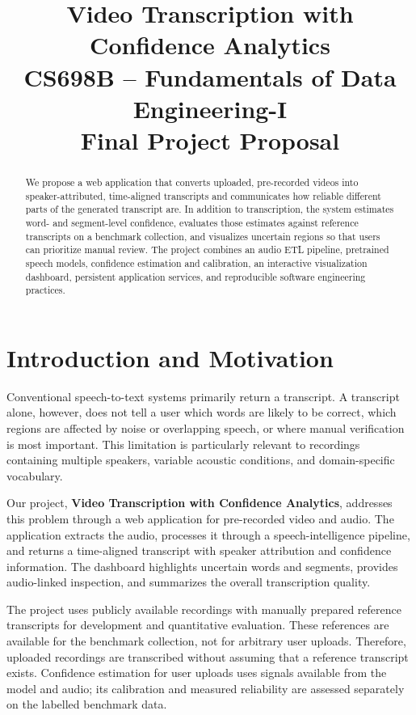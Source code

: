 \documentclass[11pt,a4paper]{article}
\title{\vspace{-1.1cm}\textbf{\Huge Video Transcription with Confidence Analytics}\\[0.35em]
\large CS698B -- Fundamentals of Data Engineering-I\\
\normalsize Final Project Proposal}
\author{}
\date{}
\begin{document}
\maketitle
\vspace{-1.2em}

\begin{abstract}
We propose a web application that converts uploaded, pre-recorded videos into
speaker-attributed, time-aligned transcripts and communicates how reliable
different parts of the generated transcript are. In addition to transcription,
the system estimates word- and segment-level confidence, evaluates those
estimates against reference transcripts on a benchmark collection, and
visualizes uncertain regions so that users can prioritize manual review.
The project combines an audio ETL pipeline, pretrained speech models,
confidence estimation and calibration, an interactive visualization
dashboard, persistent application services, and reproducible software
engineering practices.
\end{abstract}

\section{Introduction and Motivation}

Conventional speech-to-text systems primarily return a transcript. A transcript
alone, however, does not tell a user which words are likely to be correct,
which regions are affected by noise or overlapping speech, or where manual
verification is most important. This limitation is particularly relevant to
recordings containing multiple speakers, variable acoustic conditions, and
domain-specific vocabulary.

Our project, \textbf{Video Transcription with Confidence Analytics}, addresses
this problem through a web application for pre-recorded video and audio.
The application extracts the audio, processes it through a speech-intelligence
pipeline, and returns a time-aligned transcript with speaker attribution and
confidence information. The dashboard highlights uncertain words and
segments, provides audio-linked inspection, and summarizes the overall
transcription quality.

The project uses publicly available recordings with manually prepared
reference transcripts for development and quantitative evaluation. These
references are available for the benchmark collection, not for arbitrary
user uploads. Therefore, uploaded recordings are transcribed without assuming
that a reference transcript exists. Confidence estimation for user uploads
uses signals available from the model and audio; its calibration and measured
reliability are assessed separately on the labelled benchmark data.
\end{document}

